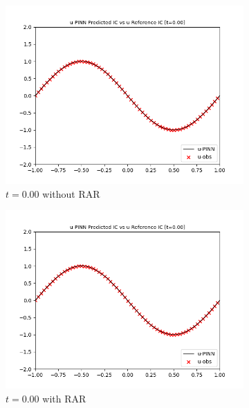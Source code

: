 \documentclass[letterpaper,11pt]{article}
\begin{document}
    \begin{figure}[h]
        \centering
        \begin{subfigure}{0.45\textwidth}
            \includegraphics*[width=\textwidth]{burgers_forward_t0.00.png}
            \caption{$t = 0.00$ without RAR}
        \end{subfigure}
        \hfill
        \begin{subfigure}{0.45\textwidth}
            \includegraphics*[width=\textwidth]{burgers_forward_t0.00_rar.png}
            \caption{$t = 0.00$ with RAR}
        \end{subfigure}
        \begin{subfigure}{0.45\textwidth}

\end{subfigure}
\end{figure}
\end{document}
